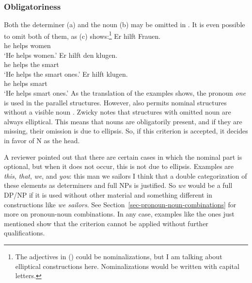 \documentclass[output=paper
  ,nobabel
  ,draftmode
  ,uniformtopskip %
  ,colorlinks, citecolor=brown
]{langscibook}
\begin{document}


\subsubsection{Obligatoriness}
\label{sec-obligatheit}

Both the determiner (a) and the noun (b) may be omitted in . It is even possible to omit both of them,
as (c) shows:\footnote{
  The adjectives in () could be nominalizations, but I am talking about elliptical
  constructions here. Nominalizations would be written with capital letters.
}
\eal
\ex 
\gll Er hilft Frauen.\\
     he helps women\\
\glt `He helps women.'
\ex 
\gll Er hilft den klugen.\\
     he helps the smart\\
\glt `He helps the smart ones.'
\ex 
\gll Er hilft klugen.\\
     he helps smart\\
\glt `He helps smart ones.'
\zl
As the translation of the examples shows, the pronoun \emph{one} is used in the parallel 
structures. However,  also permits nominal structures without a visible noun \parencites[]{Zwicky85a,AS2015a}. Zwicky notes that structures with omitted noun are always elliptical. This means
that nouns are obligatorily present, and if they are missing, their omission is due to ellipsis.
So, if this criterion is accepted, it decides in favor of N as the head.

A reviewer pointed out that there are certain cases in which the nominal part is optional, but when
it does not occur, this is not due to ellipsis. Examples are \emph{this}, \emph{that}, \emph{we}, and
\emph{you}:
\eal
\ex this man
\ex we sailors
\zl
I think that a double categorization of these elements as determiners and full NPs
is justified. So \emph{we} would be a full DP/NP if it is used without other material and something
different in constructions like \emph{we sailors}. See Section~\ref{sec-pronoun-noun-combinations} for more on pronoun-noun combinations.
In any case, examples like the ones just mentioned show that the criterion cannot be applied without
further qualifications.
\end{document}

